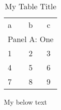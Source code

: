 \begin{table}
\centering
\begin{threeparttable}
\caption[Short Capt]{My Table Title}
\begin{tabular}{lcc}
\toprule
a & b & c\\
\multicolumn{3}{l}{Panel A: One}\\
1 & 2 & 3 \\
4 & 5 & 6 \\
7 & 8 & 9 \\
\bottomrule

\end{tabular}
\begin{tablenotes}
My below text
\end{tablenotes}
\end{threeparttable}
\end{table}